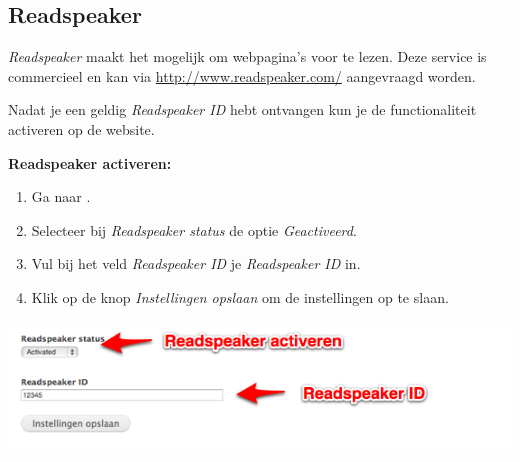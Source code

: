 \subsection{Readspeaker}\label{readspeaker}
\emph{Readspeaker} maakt het mogelijk om webpagina's voor te lezen. Deze service is commercieel en kan via \url{http://www.readspeaker.com/} aangevraagd worden. 

Nadat je een geldig \emph{Readspeaker ID} hebt ontvangen kun je de functionaliteit activeren op de website. 

\textbf{Readspeaker activeren:}

\begin{enumerate}
\item Ga naar  .
\item Selecteer bij \emph{Readspeaker status} de optie \emph{Geactiveerd}.
\item Vul bij het veld \emph{Readspeaker ID} je \emph{Readspeaker ID} in.
\item Klik op de knop \emph{Instellingen opslaan} om de instellingen op te slaan.
\end{enumerate}

\begin{center}
	\includegraphics[width=\textwidth]{img/readspeaker.png}
\end{center}